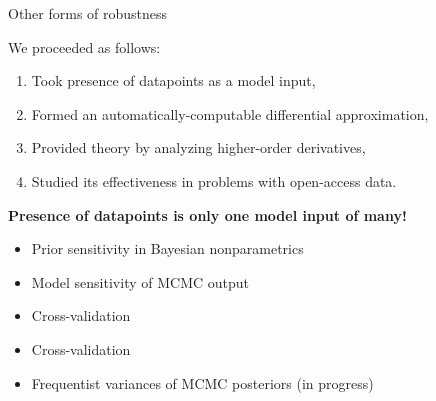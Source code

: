 
\begin{frame}[t]{Other forms of robustness}

We proceeded as follows:
\begin{enumerate}
    \item Took presence of datapoints as a model input,
    \item Formed an automatically-computable differential approximation,
    \item Provided theory by analyzing higher-order derivatives,
    \item Studied its effectiveness in problems with open-access data.
\end{enumerate}

\vspace{1em}
\textbf{Presence of datapoints is only one model input of many!}

\vspace{1em}
\begin{itemize}
    \item Prior sensitivity in Bayesian nonparametrics \citep{giordano2021bnp}
    \item Model sensitivity of MCMC output
        \citep{gustafson2000local, giordano2018covariances}
    \item Cross-validation \citep{giordano2019swiss, wilson:2020:cv}
    \item Cross-validation \citep{giordano2019swiss, wilson:2020:cv}
    \item Frequentist variances of MCMC posteriors (in progress)
\end{itemize}

\end{frame}
